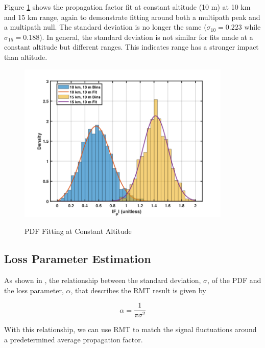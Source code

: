 Figure \ref{stat_fig:5} shows the propagation factor fit at constant altitude (10 m) at 10 km and 15 km range, again to demonstrate fitting around both a multipath peak and a multipath null. The standard deviation is no longer the same ($\sigma_{10} = 0.223$ while $\sigma_{15} = 0.188$). In general, the standard deviation is not similar for fits made at a constant altitude but different ranges. This indicates range has a stronger impact than altitude.

\begin{figure}[H]
  \begin{center}
\includegraphics[width=4in]{../media/statistics/constant_altitude_fit.png}
  \end{center}
  \renewcommand{\baselinestretch}{1} \small\normalsize
  \begin{quote}
    \caption[PDF Fitting at Constant Altitude]{PDF Fitting at Constant Altitude\label{stat_fig:5}}
  \end{quote}
\end{figure}
\renewcommand{\baselinestretch}{2} \small\normalsize

\subsection{Loss Parameter Estimation}
As shown in \cite{yeh_fading}, the relationship between the standard deviation, $\sigma$, of the PDF and the loss parameter, $\alpha$, that describes the RMT result is given by

\begin{equation}
\alpha = \frac{1}{\pi\sigma^2}
\end{equation}
\renewcommand{\baselinestretch}{2} \small\normalsize

With this relationship, we can use RMT to match the signal fluctuations around a predetermined average propagation factor.

